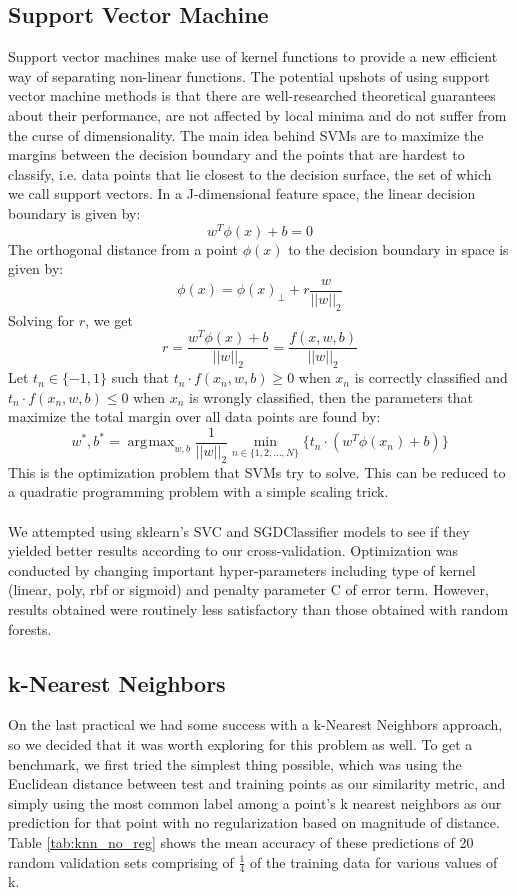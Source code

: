 \documentclass[letterpaper]{article}
\DeclareMathOperator*{\argmax}{\arg\!\max}
\begin{document}
\subsection{Support Vector Machine}
Support vector machines make use of kernel functions to provide a new efficient way of separating non-linear functions. The potential upshots of using support vector machine methods is that there are well-researched theoretical guarantees about their performance, are not affected by local minima and do not suffer from the curse of dimensionality. The main idea behind SVMs are to maximize the margins between the decision boundary and the points that are hardest to classify, i.e. data points that lie closest to the decision surface, the set of which we call support vectors. In a J-dimensional feature space, the linear decision boundary is given by:
$$w^T\phi(x) + b = 0$$
The orthogonal distance from a point $\phi(x)$ to the decision boundary in space is given by:
$$\phi(x) = \phi(x)_{\perp} + r \frac{w}{|| w ||_2}$$
Solving for $r$, we get
$$r = \frac{w^T\phi(x) + b}{||w||_2} = \frac{f(x,w,b)}{||w||_2}$$
Let $t_n \in \{-1,1\}$ such that $t_n \cdot f(x_n,w,b) \ge 0$ when $x_n$ is correctly classified and $t_n \cdot f(x_n,w,b) \le 0$ when $x_n$ is wrongly classified, then the parameters that maximize the total margin over all data points are found by:
$$w^*, b^* = \argmax_{w,b} \frac{1}{||w||_2} \min_{n \in \{1,2,...,N\}} \{ t_n \cdot (w^T\phi(x_n) + b) \}$$
This is the optimization problem that SVMs try to solve. This can be reduced to a quadratic programming problem with a simple scaling trick.\\
\\
We attempted using sklearn's SVC and SGDClassifier models to see if they yielded better results according to our cross-validation. Optimization was conducted by changing important hyper-parameters including type of kernel (linear, poly, rbf or sigmoid) and penalty parameter C of error term. However, results obtained were routinely less satisfactory than those obtained with random forests.

\subsection{k-Nearest Neighbors}

On the last practical we had some success with a k-Nearest Neighbors approach, so we decided that it was worth exploring for this problem as well. To get a benchmark, we first tried the simplest thing possible, which was using the Euclidean distance between test and training points as our similarity metric, and simply using the most common label among a point's k nearest neighbors as our prediction for that point with no regularization based on magnitude of distance. Table \ref{tab:knn_no_reg} shows the mean accuracy of these predictions of 20 random validation sets comprising of $\frac{1}{4}$ of the training data for various values of k.\
\end{document}
